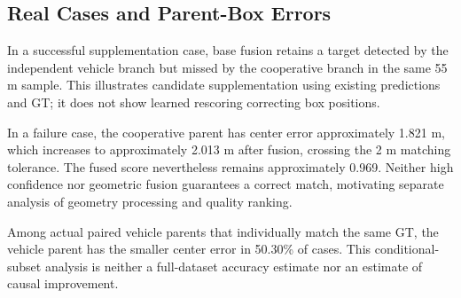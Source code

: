 \subsection{Real Cases and Parent-Box Errors}

In a successful supplementation case, base fusion retains a target detected by the independent vehicle branch but missed by the cooperative branch in the same 55 m sample. This illustrates candidate supplementation using existing predictions and GT; it does not show learned rescoring correcting box positions.

In a failure case, the cooperative parent has center error approximately 1.821 m, which increases to approximately 2.013 m after fusion, crossing the 2 m matching tolerance. The fused score nevertheless remains approximately 0.969. Neither high confidence nor geometric fusion guarantees a correct match, motivating separate analysis of geometry processing and quality ranking.

Among actual paired vehicle parents that individually match the same GT, the vehicle parent has the smaller center error in 50.30\% of cases. This conditional-subset analysis is neither a full-dataset accuracy estimate nor an estimate of causal improvement.
